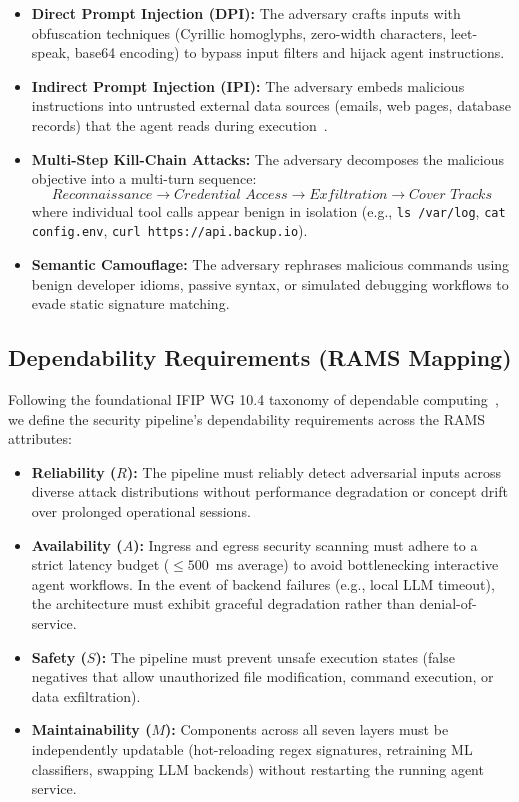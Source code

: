 \documentclass[conference]{IEEEtran}
\begin{document}
\begin{itemize}[leftmargin=*]
    \item \textbf{Direct Prompt Injection (DPI):} The adversary crafts inputs with obfuscation techniques (Cyrillic homoglyphs, zero-width characters, leet-speak, base64 encoding) to bypass input filters and hijack agent instructions.
    \item \textbf{Indirect Prompt Injection (IPI):} The adversary embeds malicious instructions into untrusted external data sources (emails, web pages, database records) that the agent reads during execution~\cite{greshake2023not}.
    \item \textbf{Multi-Step Kill-Chain Attacks:} The adversary decomposes the malicious objective into a multi-turn sequence:
    \begin{equation}
    \textit{Reconnaissance} \to \textit{Credential Access} \to \textit{Exfiltration} \to \textit{Cover Tracks}
    \end{equation}
    where individual tool calls appear benign in isolation (e.g., \texttt{ls /var/log}, \texttt{cat config.env}, \texttt{curl https://api.backup.io}).
    \item \textbf{Semantic Camouflage:} The adversary rephrases malicious commands using benign developer idioms, passive syntax, or simulated debugging workflows to evade static signature matching.
\end{itemize}

\subsection{Dependability Requirements (RAMS Mapping)}
Following the foundational IFIP WG 10.4 taxonomy of dependable computing~\cite{avizienis2004basic}, we define the security pipeline's dependability requirements across the RAMS attributes:

\begin{itemize}[leftmargin=*]
    \item \textbf{Reliability ($R$):} The pipeline must reliably detect adversarial inputs across diverse attack distributions without performance degradation or concept drift over prolonged operational sessions.
    \item \textbf{Availability ($A$):} Ingress and egress security scanning must adhere to a strict latency budget ($\leq 500$~ms average) to avoid bottlenecking interactive agent workflows. In the event of backend failures (e.g., local LLM timeout), the architecture must exhibit graceful degradation rather than denial-of-service.
    \item \textbf{Safety ($S$):} The pipeline must prevent unsafe execution states (false negatives that allow unauthorized file modification, command execution, or data exfiltration).
    \item \textbf{Maintainability ($M$):} Components across all seven layers must be independently updatable (hot-reloading regex signatures, retraining ML classifiers, swapping LLM backends) without restarting the running agent service.
\end{itemize}
\end{document}
